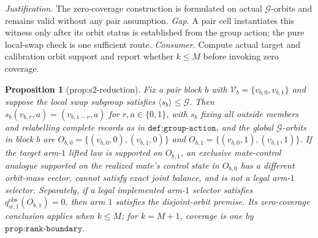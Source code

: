 \documentclass{article}
\newtheorem{proposition}{Proposition}
\begin{document}
\par\smallskip\noindent \textit{Justification.} The zero-coverage construction is formulated on actual \(\mathcal G\)-orbits and remains valid without any pair assumption. \textit{Gap.} A pair cell instantiates this witness only after its orbit status is established from the group action; the pure local-swap check is one sufficient route. \textit{Consumer.} Compute actual target and calibration orbit support and report whether \(k\le M\) before invoking zero coverage.

\begin{proposition}[prop:s2-reduction]\label{prop:s2-reduction}
Fix a pair block \(b\) with \(\mathcal V_b=\{v_{b,0},v_{b,1}\}\) and suppose the local swap subgroup satisfies \(\langle s_b\rangle\le\mathcal G\). Then \(s_b(v_{b,r},a)=(v_{b,1-r},a)\) for \(r,a\in\{0,1\}\), with \(s_b\) fixing all outside members and relabelling complete records as in \(\texttt{def:group-action}\), and the global \(\mathcal G\)-orbits in block \(b\) are \(O_{b,0}=\{(v_{b,0},0),(v_{b,1},0)\}\) and \(O_{b,1}=\{(v_{b,0},1),(v_{b,1},1)\}\). If the target arm-\(1\) lifted law is supported on \(O_{b,1}\), an exclusive mate-control analogue supported on the realized mate's control state in \(O_{b,0}\) has a different orbit-mass vector, cannot satisfy exact joint balance, and is not a legal arm-\(1\) selector. Separately, if a legal implemented arm-\(1\) selector satisfies \(q^{\mathrm{obs}}_{w,1}(O_{b,1})=0\), then arm \(1\) satisfies the disjoint-orbit premise. Its zero-coverage conclusion applies when \(k\le M\); for \(k=M+1\), coverage is one by \(\texttt{prop:rank-boundary}\).
\end{proposition}
\end{document}
